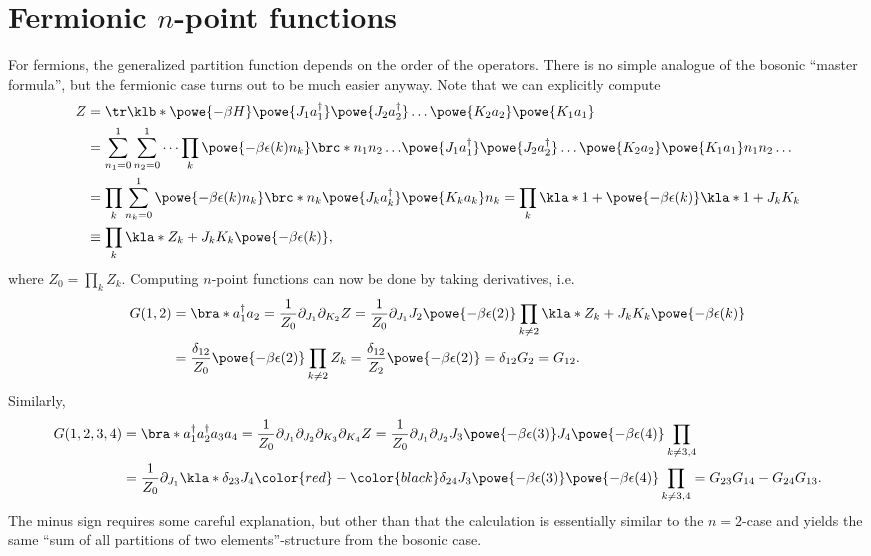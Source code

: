 \documentclass[english, parskip=full]{scrartcl}
\begin{document}
\section{Fermionic $n$-point functions}
For fermions, the generalized partition function depends on the order of the operators.
There is no simple analogue of the bosonic ``master formula'', but the fermionic case turns out to be much easier anyway.
Note that we can explicitly compute
\begin{align}
Z &= \tr \klb*{\powe{-\beta H} \powe{J_1a_1^\dagger} \powe{J_2a_2^\dagger} \dots \powe{K_2a_2} \powe{K_1a_1}} \\
&= \sum_{n_1=0}^1 \sum_{n_2=0}^1 \dots \prod_k \powe{-\beta \epsilon(k)n_k} \brc*{n_1n_2\dots}{ \powe{J_1a_1^\dagger} \powe{J_2a_2^\dagger} \dots \powe{K_2a_2} \powe{K_1a_1} }{n_1n_2\dots }\\
&= \prod_k \sum_{n_k=0}^1 \powe{-\beta \epsilon(k)n_k} \brc*{n_k}{ \powe{J_ka_k^\dagger} \powe{K_ka_k} }{n_k} = \prod_k \kla*{1 + \powe{-\beta \epsilon(k)} \kla*{1 + J_kK_k}} \\
&\equiv \prod_k \kla*{Z_k + J_kK_k \powe{-\beta\epsilon(k)}},
\end{align}
where $Z_0 = \prod_k Z_k$.
Computing $n$-point functions can now be done by taking derivatives, i.e.
\begin{align}
G(1,2) &= \bra*{a_1^\dagger a_2} = \frac{1}{Z_0} \partial_{J_1} \partial_{K_2} Z = \frac{1}{Z_0} \partial_{J_1} J_2 \powe{-\beta\epsilon(2)} \prod_{k\neq 2} \kla*{Z_k + J_kK_k\powe{-\beta\epsilon(k)}} \\
&= \frac{\delta_{12}}{Z_0} \powe{-\beta\epsilon(2)} \prod_{k\neq 2} Z_k = \frac{\delta_{12}}{Z_2} \powe{-\beta \epsilon(2)} = \delta_{12} G_2 = G_{12}.
\end{align}
Similarly, 
\begin{align}
G(1,2,3,4) &= \bra*{a_1^\dagger a_2^\dagger a_3a_4} = \frac{1}{Z_0} \partial_{J_1} \partial_{J_2} \partial_{K_3}\partial_{K_4} Z = \frac{1}{Z_0} \partial_{J_1} \partial_{J_2} J_3\powe{-\beta\epsilon(3)} J_4 \powe{-\beta\epsilon(4)} \prod_{k\neq 3,4}\\
&= \frac{1}{Z_0} \partial_{J_1} \kla*{\delta_{23} J_4 \color{red} - \color{black} \delta_{24} J_3} \powe{-\beta\epsilon(3)} \powe{-\beta\epsilon(4)} \prod_{k\neq 3,4} = G_{23} G_{14} - G_{24}G_{13}.
\end{align}
The minus sign requires some careful explanation, but other than that the calculation is essentially similar to the $n=2$-case and yields the same ``sum of all partitions of two elements''-structure from the bosonic case.
\end{document}
